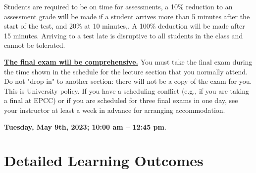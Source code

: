 \documentclass[12pt]{scrartcl}
\begin{document}
{\color{red}Students are required to be on time for assessments, a 10\% reduction to an assessment grade will be made if a student arrives more than 5 minutes after the start of the test, and 20\% at 10 minutes,.
A 100\% deduction will be made after 15 minutes.}
Arriving to a test late is disruptive to all students in the class and cannot be tolerated. 
 

\textbf{\underline{The final exam will be comprehensive.}}
You must take the final exam during the time shown in the schedule for the lecture section that you normally attend. 
Do not "drop in" to another section: there will not be a copy of the exam for you. 
This is University policy. If you have a scheduling conflict (e.g., if you are taking a final at EPCC) or if you are scheduled for three final exams in one day, see your instructor at least a week in advance for arranging accommodation.
\begin{tcolorbox}[colback=green!5,colframe=green!75!black,title=Final Exam Date]
\begin{center}
\textbf{Tuesday, May 9th, 2023; 10:00 am – 12:45 pm}.
 \end{center}
 \end{tcolorbox}



\section{Detailed Learning Outcomes}
\end{document}
